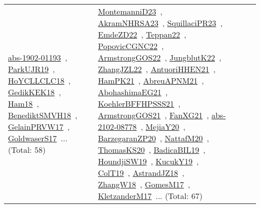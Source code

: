 {\begin{longtable}{lp{3cm}>{\raggedright\arraybackslash}p{6cm}>{\raggedright\arraybackslash}p{6cm}>{\raggedright\arraybackslash}p{8cm}}
\href{works/abs-1902-01193.pdf}{abs-1902-01193}~\cite{abs-1902-01193}, \href{works/ParkUJR19.pdf}{ParkUJR19}~\cite{ParkUJR19}, \href{works/HoYCLLCLC18.pdf}{HoYCLLCLC18}~\cite{HoYCLLCLC18}, \href{works/GedikKEK18.pdf}{GedikKEK18}~\cite{GedikKEK18}, \href{works/Ham18.pdf}{Ham18}~\cite{Ham18}, \href{works/BenediktSMVH18.pdf}{BenediktSMVH18}~\cite{BenediktSMVH18}, \href{works/GelainPRVW17.pdf}{GelainPRVW17}~\cite{GelainPRVW17}, \href{works/GoldwaserS17.pdf}{GoldwaserS17}~\cite{GoldwaserS17}... (Total: 58) & \href{works/MontemanniD23.pdf}{MontemanniD23}~\cite{MontemanniD23}, \href{works/AkramNHRSA23.pdf}{AkramNHRSA23}~\cite{AkramNHRSA23}, \href{works/SquillaciPR23.pdf}{SquillaciPR23}~\cite{SquillaciPR23}, \href{works/EmdeZD22.pdf}{EmdeZD22}~\cite{EmdeZD22}, \href{works/Teppan22.pdf}{Teppan22}~\cite{Teppan22}, \href{works/PopovicCGNC22.pdf}{PopovicCGNC22}~\cite{PopovicCGNC22}, \href{works/ArmstrongGOS22.pdf}{ArmstrongGOS22}~\cite{ArmstrongGOS22}, \href{works/JungblutK22.pdf}{JungblutK22}~\cite{JungblutK22}, \href{works/ZhangJZL22.pdf}{ZhangJZL22}~\cite{ZhangJZL22}, \href{works/AntuoriHHEN21.pdf}{AntuoriHHEN21}~\cite{AntuoriHHEN21}, \href{works/HamPK21.pdf}{HamPK21}~\cite{HamPK21}, \href{works/AbreuAPNM21.pdf}{AbreuAPNM21}~\cite{AbreuAPNM21}, \href{works/AbohashimaEG21.pdf}{AbohashimaEG21}~\cite{AbohashimaEG21}, \href{works/KoehlerBFFHPSSS21.pdf}{KoehlerBFFHPSSS21}~\cite{KoehlerBFFHPSSS21}, \href{works/ArmstrongGOS21.pdf}{ArmstrongGOS21}~\cite{ArmstrongGOS21}, \href{works/FanXG21.pdf}{FanXG21}~\cite{FanXG21}, \href{works/abs-2102-08778.pdf}{abs-2102-08778}~\cite{abs-2102-08778}, \href{works/MejiaY20.pdf}{MejiaY20}~\cite{MejiaY20}, \href{works/BarzegaranZP20.pdf}{BarzegaranZP20}~\cite{BarzegaranZP20}, \href{works/NattafM20.pdf}{NattafM20}~\cite{NattafM20}, \href{works/ThomasKS20.pdf}{ThomasKS20}~\cite{ThomasKS20}, \href{works/BadicaBIL19.pdf}{BadicaBIL19}~\cite{BadicaBIL19}, \href{works/HoundjiSW19.pdf}{HoundjiSW19}~\cite{HoundjiSW19}, \href{works/KucukY19.pdf}{KucukY19}~\cite{KucukY19}, \href{works/ColT19.pdf}{ColT19}~\cite{ColT19}, \href{works/AstrandJZ18.pdf}{AstrandJZ18}~\cite{AstrandJZ18}, \href{works/ZhangW18.pdf}{ZhangW18}~\cite{ZhangW18}, \href{works/GomesM17.pdf}{GomesM17}~\cite{GomesM17}, \href{works/KletzanderM17.pdf}{KletzanderM17}~\cite{KletzanderM17}... (Total: 67)\\

\end{longtable}}
